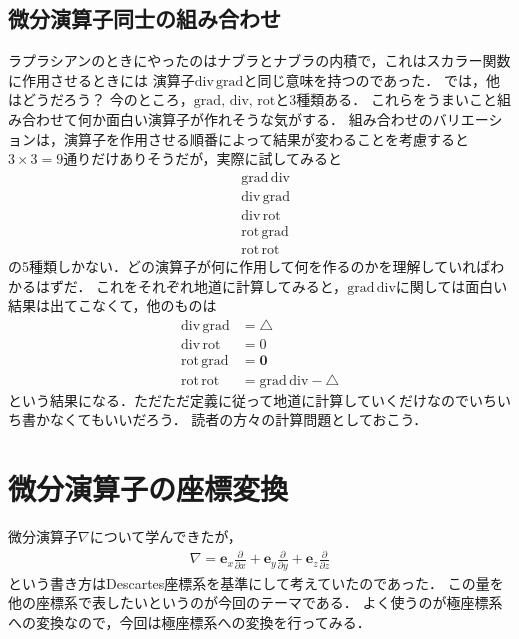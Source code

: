 \subsection{微分演算子同士の組み合わせ}
ラプラシアンのときにやったのはナブラとナブラの内積で，これはスカラー関数に作用させるときには
演算子$\mathrm{div \, grad}$と同じ意味を持つのであった．
では，他はどうだろう？ 今のところ，$\mathrm{grad, \, div, \, rot}$と3種類ある．
これらをうまいこと組み合わせて何か面白い演算子が作れそうな気がする．
組み合わせのバリエーションは，演算子を作用させる順番によって結果が変わることを考慮すると
$3 \times 3 =9$通りだけありそうだが，実際に試してみると
\begin{align*}
&\mathrm{grad \, div} \\
&\mathrm{div \, grad} \\
&\mathrm{div \, rot} \\
&\mathrm{rot \, grad} \\
&\mathrm{rot \, rot} 
\end{align*}
の5種類しかない．どの演算子が何に作用して何を作るのかを理解していればわかるはずだ．
これをそれぞれ地道に計算してみると，$\mathrm{grad \, div}$に関しては面白い結果は出てこなくて，他のものは
\begin{align}
\mathrm{div \, grad} &= \bigtriangleup \\
\mathrm{div \, rot} &= 0 \\
\mathrm{rot \, grad} &= \bm{0} \\
\mathrm{rot \, rot} &= \mathrm{grad \, div} - \bigtriangleup
\end{align}
という結果になる．ただただ定義に従って地道に計算していくだけなのでいちいち書かなくてもいいだろう．
読者の方々の計算問題としておこう．

\section{微分演算子の座標変換}
微分演算子$\nabla$について学んできたが，
\begin{align*}
\nabla = \bm{e}_x \frac{ \partial}{\partial x} + \bm{e}_y \frac{ \partial}{\partial y}
+ \bm{e}_z \frac{ \partial}{\partial z}
\end{align*}
という書き方はDescartes座標系を基準にして考えていたのであった．
この量を他の座標系で表したいというのが今回のテーマである．
よく使うのが極座標系への変換なので，今回は極座標系への変換を行ってみる．

